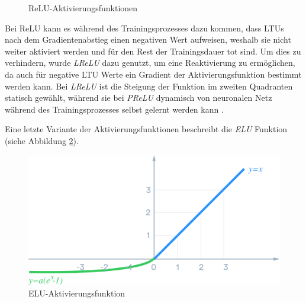 \begin{figure}[ht]
	\caption[ReLU-Aktivierungsfunktionen]{ReLU-Aktivierungsfunktionen \cite{DanqingLiu.20171130}} 
	\label{relu}
\end{figure} 

Bei ReLU kann es während des Trainingsprozesses dazu kommen, dass LTUs nach dem Gradientenabstieg einen negativen Wert aufweisen, weshalb sie nicht weiter aktiviert werden und für den Rest der Trainingsdauer \glqq tot\grqq{} sind. Um dies zu verhindern, wurde \textit{LReLU} dazu genutzt, um eine Reaktivierung zu ermöglichen, da auch für negative LTU Werte ein Gradient der Aktivierungsfunktion bestimmt werden kann. Bei \textit{LReLU} ist die Steigung der Funktion im zweiten Quadranten statisch gewählt, während sie bei \textit{PReLU} dynamisch von neuronalen Netz während des Trainingsprozesses selbst gelernt werden kann \cite{AurelienGeron.2018}.

Eine letzte Variante der Aktivierungsfunktionen beschreibt die \textit{ELU} Funktion (siehe Abbildung \ref{elu}).

\begin{figure}[ht]
	\begin{center}
		\includegraphics[width=12cm]{Bilder/elu.png} 
		\caption[ELU-Aktivierungsfunktion]{ELU-Aktivierungsfunktion \cite{DanqingLiu.20171130}}
		\label{elu}
	\end{center}
\end{figure}

